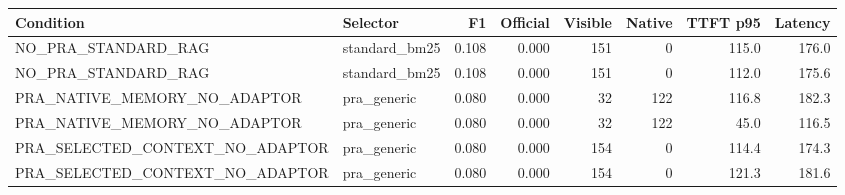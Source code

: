\begin{tabular}{llrrrrrr}
\toprule
Condition & Selector & F1 & Official & Visible & Native & TTFT p95 & Latency \\
\midrule
NO\_PRA\_STANDARD\_RAG & standard\_bm25 & 0.108 & 0.000 & 151 & 0 & 115.0 & 176.0 \\
NO\_PRA\_STANDARD\_RAG & standard\_bm25 & 0.108 & 0.000 & 151 & 0 & 112.0 & 175.6 \\
PRA\_NATIVE\_MEMORY\_NO\_ADAPTOR & pra\_generic & 0.080 & 0.000 & 32 & 122 & 116.8 & 182.3 \\
PRA\_NATIVE\_MEMORY\_NO\_ADAPTOR & pra\_generic & 0.080 & 0.000 & 32 & 122 & 45.0 & 116.5 \\
PRA\_SELECTED\_CONTEXT\_NO\_ADAPTOR & pra\_generic & 0.080 & 0.000 & 154 & 0 & 114.4 & 174.3 \\
PRA\_SELECTED\_CONTEXT\_NO\_ADAPTOR & pra\_generic & 0.080 & 0.000 & 154 & 0 & 121.3 & 181.6 \\
\bottomrule
\end{tabular}
